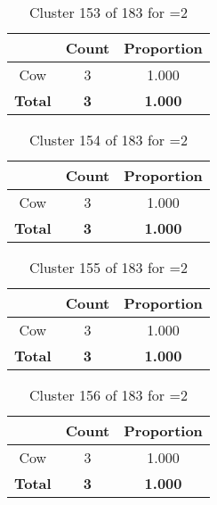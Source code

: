 \begin{table}[ht!]
\centering
\begin{tabular}{|c|c|c|}
\hline
\bf \Spec{} &\bf Count &\bf Proportion\\ \hline \hline
Cow & 3 & 1.000\\ \hline
\hline
\bf Total & \bf 3 & \bf 1.000\\ \hline
\end{tabular}
\label{tab:cluster:153:2}
\caption{Cluster 153 of 183 for \minneigh{}=2}
\end{table}

\begin{table}[ht!]
\centering
\begin{tabular}{|c|c|c|}
\hline
\bf \Spec{} &\bf Count &\bf Proportion\\ \hline \hline
Cow & 3 & 1.000\\ \hline
\hline
\bf Total & \bf 3 & \bf 1.000\\ \hline
\end{tabular}
\label{tab:cluster:154:2}
\caption{Cluster 154 of 183 for \minneigh{}=2}
\end{table}

\begin{table}[ht!]
\centering
\begin{tabular}{|c|c|c|}
\hline
\bf \Spec{} &\bf Count &\bf Proportion\\ \hline \hline
Cow & 3 & 1.000\\ \hline
\hline
\bf Total & \bf 3 & \bf 1.000\\ \hline
\end{tabular}
\label{tab:cluster:155:2}
\caption{Cluster 155 of 183 for \minneigh{}=2}
\end{table}

\begin{table}[ht!]
\centering
\begin{tabular}{|c|c|c|}
\hline
\bf \Spec{} &\bf Count &\bf Proportion\\ \hline \hline
Cow & 3 & 1.000\\ \hline
\hline
\bf Total & \bf 3 & \bf 1.000\\ \hline
\end{tabular}
\label{tab:cluster:156:2}
\caption{Cluster 156 of 183 for \minneigh{}=2}
\end{table}


